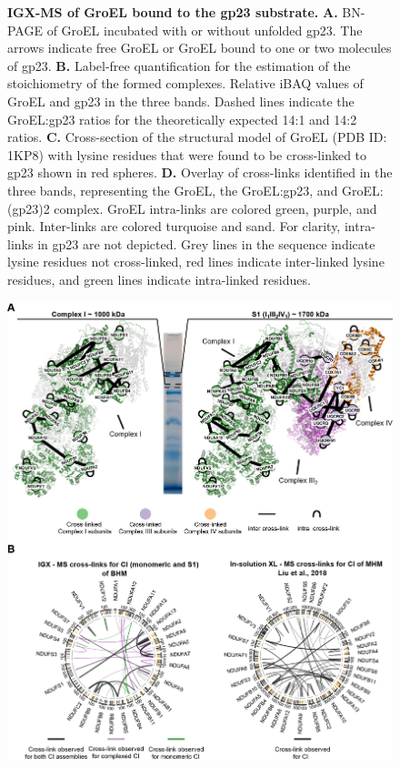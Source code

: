 \begin{subappendices}
\begin{figure}[hbt]
        \caption{\textbf{IGX-MS of GroEL bound to the gp23 substrate.} \textbf{A.} BN-PAGE of GroEL incubated with or without unfolded gp23. The arrows indicate free GroEL or GroEL bound to one or two molecules of gp23. \textbf{B.} Label-free quantification for the estimation of the stoichiometry of the formed complexes. Relative iBAQ values of GroEL and gp23 in the three bands. Dashed lines indicate the GroEL:gp23 ratios for the theoretically expected 14:1 and 14:2 ratios. \textbf{C.} Cross-section of the structural model of GroEL (PDB ID: 1KP8) with lysine residues that were found to be cross-linked to gp23 shown in red spheres. \textbf{D.} Overlay of cross-links identified in the three bands, representing the GroEL, the GroEL:gp23, and GroEL:(gp23)2 complex. GroEL intra-links are colored green, purple, and pink. Inter-links are colored turquoise and sand. For clarity, intra-links in gp23 are not depicted. Grey lines in the sequence indicate lysine residues not cross-linked, red lines indicate inter-linked lysine residues, and green lines indicate intra-linked residues.}
        \label{fig:ch2_app_fig4}
    \end{figure}
    \begin{figure}[hb]
        \center
        \includegraphics[]{Chapter.2/Figures/EV_Figure1.png}

\end{figure}
\end{subappendices}
